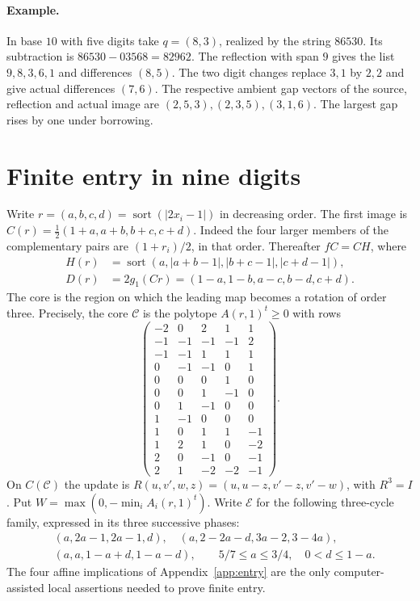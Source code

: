 \documentclass[11pt,reqno]{amsart}
\newcommand{\sort}{\operatorname{sort}}
\begin{document}
\paragraph{Example.}
In base $10$ with five digits take $q=(8,3)$, realized by the string
$86530$. Its subtraction is $86530-03568=82962$.
The reflection with span $9$ gives the list $9,8,3,6,1$ and differences
$(8,5)$. The two digit changes replace $3,1$ by $2,2$ and give actual
differences $(7,6)$. The respective ambient gap vectors of the source,
reflection and actual image are $(2,5,3),(2,3,5),(3,1,6)$. The largest
gap rises by one under borrowing.

\section{Finite entry in nine digits}\label{sec:entry}
Write $r=(a,b,c,d)=\sort(|2x_i-1|)$ in decreasing order. The first image is
$C(r)=\tfrac12(1+a,a+b,b+c,c+d)$. Indeed the four larger members of the
complementary pairs are $(1+r_i)/2$, in that order. Thereafter $fC=CH$, where
\begin{align*}
 H(r)&=\sort(a,|a+b-1|,|b+c-1|,|c+d-1|),\\
 D(r)&=2g_1(Cr)=(1-a,1-b,a-c,b-d,c+d).
\end{align*}
The core is the region on which the leading map becomes a rotation of
order three. Precisely, the core $\mathcal C$ is the polytope $A(r,1)^t\ge0$ with rows
\begin{equation}\label{eq:core}
\begin{pmatrix}
-2&0&2&1&1\\-1&-1&-1&-1&2\\-1&-1&1&1&1\\0&-1&-1&0&1\\
0&0&0&1&0\\0&0&1&-1&0\\0&1&-1&0&0\\1&-1&0&0&0\\
1&0&1&1&-1\\1&2&1&0&-2\\2&0&-1&0&-1\\2&1&-2&-2&-1
\end{pmatrix}.
\end{equation}
On $C(\mathcal C)$ the update is $R(u,v',w,z)=(u,u-z,v'-z,v'-w)$,
with $R^3=I$. Put $W=\max(0,-\min_i A_i(r,1)^t)$.
Write $\mathcal E$ for the following three-cycle family, expressed in
its three successive phases:
\begin{align*}
 &(a,2a-1,2a-1,d),\quad (a,2-2a-d,3a-2,3-4a),\\
 &(a,a,1-a+d,1-a-d),\qquad 5/7\le a\le3/4,\quad 0<d\le1-a .
\end{align*}
The four affine implications of Appendix~\ref{app:entry} are the only
computer-assisted local assertions needed to prove finite entry.
\end{document}
